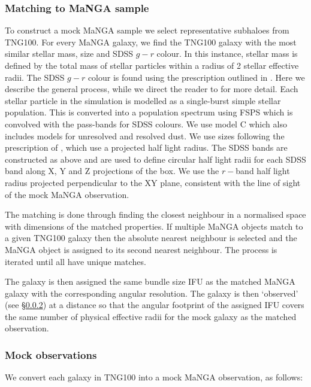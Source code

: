 \subsubsection{Matching to MaNGA sample}
To construct a mock MaNGA sample we select representative subhaloes from TNG100. For every MaNGA galaxy, we find the TNG100 galaxy with the most similar stellar mass, size and SDSS $g - r$ colour. In this instance, stellar mass is defined by the total mass of stellar particles within a radius of 2 stellar effective radii. The SDSS $g - r$ colour is found using the prescription outlined in \citet{nelson18}. Here we describe the general process, while we direct the reader to \citet{nelson18} for more detail. Each stellar particle in the simulation is modelled as a single-burst simple stellar population. This is converted into a population spectrum using FSPS \citep{conroy2009,conroy2010,foreman_mackey2014} which is convolved with the pass-bands for SDSS colours. We use model C \citep[as described in][]{nelson18} which also includes models for unresolved and resolved dust. We use sizes following the prescription of \citet{genel2018}, which use a projected half light radius. The SDSS bands are constructed as above and are used to define circular half light radii for each SDSS band along X, Y and Z projections of the box. We use the $r-$band half light radius projected perpendicular to the XY plane, consistent with the line of sight of the mock MaNGA observation.

The matching is done through finding the closest neighbour in a normalised space with dimensions of the matched properties. If multiple MaNGA objects match to a given TNG100 galaxy then the absolute nearest neighbour is selected and the MaNGA object is assigned to its second nearest neighbour. The process is iterated until all have unique matches. 

The galaxy is then assigned the same bundle size IFU as the matched MaNGA galaxy with the corresponding angular resolution. The galaxy is then `observed' (see \S\ref{sec:mock_obs}) at a distance so that the angular footprint of the assigned IFU covers the same number of physical effective radii for the mock galaxy as the matched observation. 

\subsubsection{Mock observations} \label{sec:mock_obs}
We convert each galaxy in TNG100 into a mock MaNGA observation, as follows:

